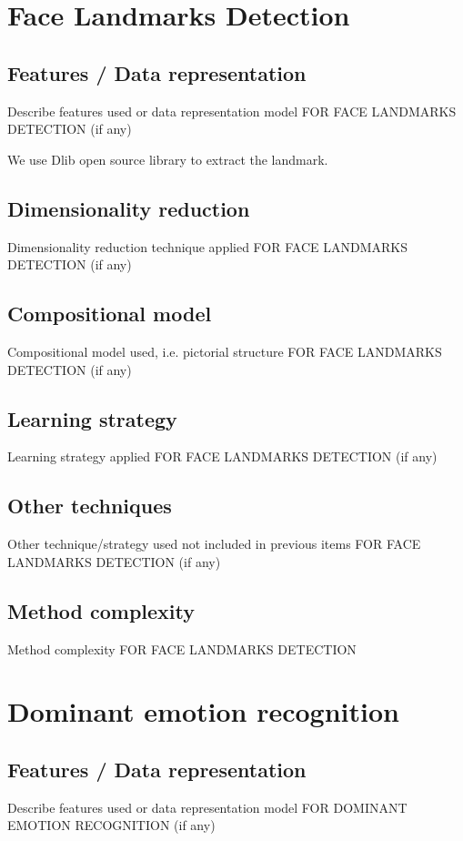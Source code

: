 \documentclass{article}
\begin{document}
\section{Face Landmarks Detection}
\subsection{Features / Data representation}
Describe features used or data representation model FOR FACE LANDMARKS DETECTION (if any)

We use Dlib open source library to extract the landmark.

\subsection{Dimensionality reduction}
Dimensionality reduction technique applied FOR FACE LANDMARKS DETECTION (if any)

\subsection{Compositional model}
Compositional model used, i.e. pictorial structure FOR FACE LANDMARKS DETECTION (if any)

\subsection{Learning strategy}
Learning strategy applied FOR FACE LANDMARKS DETECTION (if any)

\subsection{Other techniques}
Other technique/strategy used not included in previous items FOR FACE LANDMARKS DETECTION (if any)

\subsection{Method complexity}
Method complexity FOR FACE LANDMARKS DETECTION


\section{Dominant emotion recognition}
\subsection{Features / Data representation}
Describe features used or data representation model FOR DOMINANT EMOTION RECOGNITION (if any)
\end{document}
